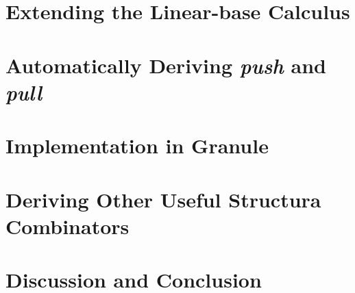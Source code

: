 

\section{Extending the Linear-base Calculus}
\label{sec:der-calculus}


\section{Automatically Deriving \emph{push} and \emph{pull}}
\label{sec:push-pull}


\section{Implementation in Granule}
\label{sec:implementaton}


% 

% 

\section{Deriving Other Useful Structura Combinators}
\label{sec:other}


\section{Discussion and Conclusion}
\label{sec:der-conclusion}


